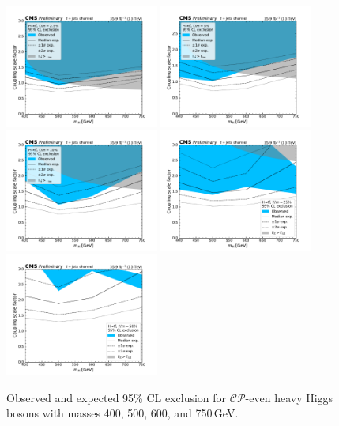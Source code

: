 \begin{figure}
  \centering
  \includegraphics[width=0.45\textwidth]{fig/chapt7/stat/limits/H-relW2p5.pdf}
  \includegraphics[width=0.45\textwidth]{fig/chapt7/stat/limits/H-relW5.pdf} \\
  \includegraphics[width=0.45\textwidth]{fig/chapt7/stat/limits/H-relW10.pdf}
  \includegraphics[width=0.45\textwidth]{fig/chapt7/stat/limits/H-relW25.pdf} \\
  \includegraphics[width=0.45\textwidth]{fig/chapt7/stat/limits/H-relW50.pdf}
  \caption{Observed and expected 95\% CL exclusion for $\mathcal{CP}$-even heavy Higgs bosons with masses 400, 500, 600, and 750\,GeV.}
  \label{Fig:LimitsCPEven}
\end{figure}

